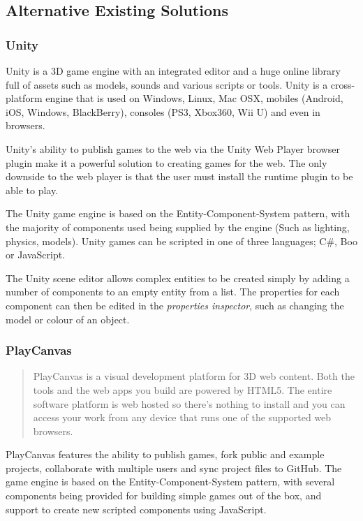 \documentclass[a4paper, 12pt]{article}
\begin{document}
\subsection{Alternative Existing Solutions}
\subsubsection{Unity}
Unity is a 3D game engine with an integrated editor and a huge online library full of assets such as models, sounds and various scripts or tools. Unity is a cross-platform engine that is used on Windows, Linux, Mac OSX, mobiles (Android, iOS, Windows, BlackBerry), consoles (PS3, Xbox360, Wii U) and even in browsers.\cite{unity}

Unity's ability to publish games to the web via the Unity Web Player browser plugin make it a powerful solution to creating games for the web. The only downside to the web player is that the user must install the runtime plugin to be able to play.\cite{unityweb}

The Unity game engine is based on the Entity-Component-System pattern, with the majority of components used being supplied by the engine (Such as lighting, physics, models).\cite{unitycomponents} Unity games can be scripted in one of three languages; C\#, Boo or JavaScript.

The Unity scene editor allows complex entities to be created simply by adding a number of components to an empty entity from a list. The properties for each component can then be edited in the \emph{properties inspector}, such as changing the model or colour of an object. \cite{unitycreatingscenes}


\subsubsection{PlayCanvas}
\begin{quote}
PlayCanvas is a visual development platform for 3D web content. Both the tools and the web apps you build are powered by HTML5. The entire software platform is web hosted so there's nothing to install and you can access your work from any device that runs one of the supported web browsers.\cite{playcanvas}
\end{quote}

PlayCanvas features the ability to publish games, fork public and example projects, collaborate with multiple users and sync project files to GitHub. The game engine is based on the Entity-Component-System pattern, with several components being provided for building simple games out of the box, and support to create new scripted components using JavaScript.\cite{playcanvas}
\end{document}
